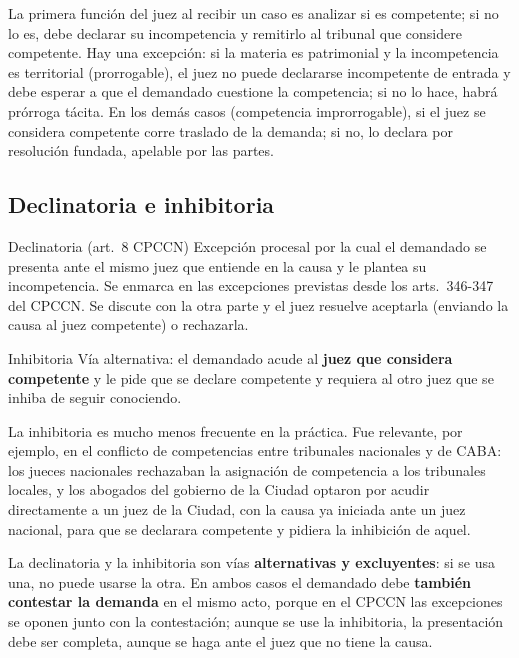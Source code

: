 \documentclass[12pt,oneside]{book}
\begin{document}
La primera función del juez al recibir un caso es analizar si es competente; si no lo es, debe declarar su incompetencia y remitirlo al tribunal que considere competente. Hay una excepción: si la materia es patrimonial y la incompetencia es territorial (prorrogable), el juez no puede declararse incompetente de entrada y debe esperar a que el demandado cuestione la competencia; si no lo hace, habrá prórroga tácita. En los demás casos (competencia improrrogable), si el juez se considera competente corre traslado de la demanda; si no, lo declara por resolución fundada, apelable por las partes.

\subsection{Declinatoria e inhibitoria}

\begin{definition}{Declinatoria (art.~8 CPCCN)}
Excepción procesal por la cual el demandado se presenta ante el mismo juez que entiende en la causa y le plantea su incompetencia. Se enmarca en las excepciones previstas desde los arts.~346-347 del CPCCN. Se discute con la otra parte y el juez resuelve aceptarla (enviando la causa al juez competente) o rechazarla.
\end{definition}

\begin{definition}{Inhibitoria}
Vía alternativa: el demandado acude al \textbf{juez que considera competente} y le pide que se declare competente y requiera al otro juez que se inhiba de seguir conociendo.
\end{definition}

La inhibitoria es mucho menos frecuente en la práctica. Fue relevante, por ejemplo, en el conflicto de competencias entre tribunales nacionales y de CABA: los jueces nacionales rechazaban la asignación de competencia a los tribunales locales, y los abogados del gobierno de la Ciudad optaron por acudir directamente a un juez de la Ciudad, con la causa ya iniciada ante un juez nacional, para que se declarara competente y pidiera la inhibición de aquel.

\begin{important}
La declinatoria y la inhibitoria son vías \textbf{alternativas y excluyentes}: si se usa una, no puede usarse la otra. En ambos casos el demandado debe \textbf{también contestar la demanda} en el mismo acto, porque en el CPCCN las excepciones se oponen junto con la contestación; aunque se use la inhibitoria, la presentación debe ser completa, aunque se haga ante el juez que no tiene la causa.
\end{important}
\end{document}
